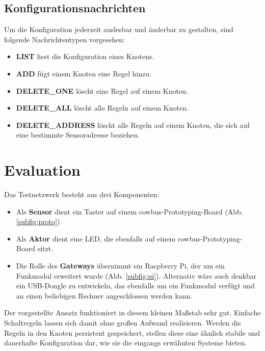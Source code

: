 \documentclass[conference]{IEEEtran}
\begin{document}
    \subsection{Konfigurationsnachrichten}
        Um die Konfiguration jederzeit auslesbar und änderbar zu gestalten,
        sind folgende Nachrichtentypen vorgesehen:

        \begin{itemize}
            \item \textbf{LIST} liest die Konfiguration eines Knotens.
            \item \textbf{ADD} fügt einem Knoten eine Regel hinzu.
            \item \textbf{DELETE\_ONE} löscht eine Regel auf einem Knoten.
            \item \textbf{DELETE\_ALL} löscht alle Regeln auf einem Knoten.
            \item \textbf{DELETE\_ADDRESS} löscht alle Regeln auf einem Knoten,
                die sich auf eine bestimmte Sensoradresse beziehen.
        \end{itemize}



\section{Evaluation}
    Das Testnetzwerk besteht aus drei Komponenten:
    \begin{itemize}
        \item Als \textbf{Sensor} dient ein Taster auf einem
            cowbus-Prototyping-Board (Abb. \ref{subfig:proto}).
        \item Als \textbf{Aktor} dient eine \ac{LED},
            die ebenfalls auf einem cowbus-Prototyping-Board sitzt.
        \item Die Rolle des \textbf{Gateways} übernimmt ein Raspberry Pi,
            der um ein Funkmodul erweitert wurde (Abb. \ref{subfig:pi}).
            Alternativ wäre auch denkbar ein USB-Dongle zu entwickeln,
            das ebenfalls um ein Funkmodul verfügt und an einen beliebigen
            Rechner angeschlossen werden kann.
    \end{itemize}

    Der vorgestellte Ansatz funktioniert in diesem kleinen Maßstab sehr gut.
    Einfache Schaltregeln lassen sich damit ohne großen Aufwand
    realisieren. Werden die Regeln in den Knoten persistent gespeichert,
    stellen diese eine ähnlich stabile und dauerhafte Konfiguration dar, wie
    sie die eingangs erwähnten Systeme bieten.
\end{document}
